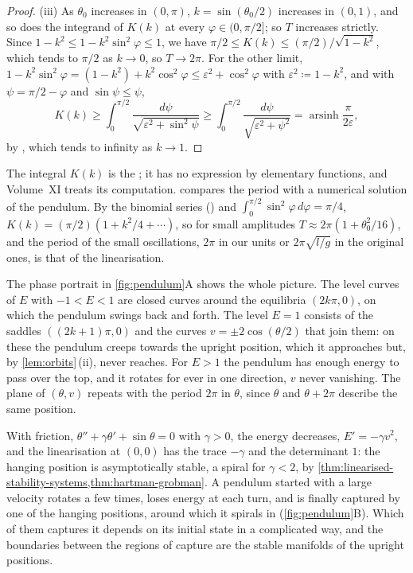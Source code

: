 \begin{proof}
(iii) As $\theta_0$ increases in $(0,\pi)$, $k=\sin(\theta_0/2)$ increases in $(0,1)$, and so does the integrand of $K(k)$ at every $\varphi\in(0,\pi/2]$; so $T$ increases strictly. Since $1-k^2\le1-k^2\sin^2\varphi\le1$, we have $\pi/2\le K(k)\le(\pi/2)/\sqrt{1-k^2}$, which tends to $\pi/2$ as $k\to0$, so $T\to2\pi$. For the other limit, $1-k^2\sin^2\varphi=(1-k^2)+k^2\cos^2\varphi\le\varepsilon^2+\cos^2\varphi$ with $\varepsilon^2\coloneqq1-k^2$, and with $\psi=\pi/2-\varphi$ and $\sin\psi\le\psi$,
\[
K(k)\ge\int_0^{\pi/2}\frac{d\psi}{\sqrt{\varepsilon^2+\sin^2\psi}}\ge\int_0^{\pi/2}\frac{d\psi}{\sqrt{\varepsilon^2+\psi^2}}=\operatorname{arsinh}\frac\pi{2\varepsilon},
\]
by , which tends to infinity as $k\to1$.
\end{proof}

The integral $K(k)$ is the ; it has no expression by elementary functions, and Volume~XI treats its computation.  compares the period with a numerical solution of the pendulum. By the binomial series () and $\int_0^{\pi/2}\sin^2\varphi\,d\varphi=\pi/4$, $K(k)=(\pi/2)(1+k^2/4+\cdots)$, so for small amplitudes $T\approx2\pi(1+\theta_0^2/16)$, and the period of the small oscillations, $2\pi$ in our units or $2\pi\sqrt{l/g}$ in the original ones, is that of the linearisation.

The phase portrait in \cref{fig:pendulum}A shows the whole picture. The level curves of $E$ with $-1<E<1$ are closed curves around the equilibria $(2k\pi,0)$, on which the pendulum swings back and forth. The level $E=1$ consists of the saddles $((2k+1)\pi,0)$ and the curves $v=\pm2\cos(\theta/2)$ that join them: on these  the pendulum creeps towards the upright position, which it approaches but, by \cref{lem:orbits}\,(ii), never reaches. For $E>1$ the pendulum has enough energy to pass over the top, and it rotates for ever in one direction, $v$ never vanishing. The plane of $(\theta,v)$ repeats with the period $2\pi$ in $\theta$, since $\theta$ and $\theta+2\pi$ describe the same position.

With friction, $\theta''+\gamma\theta'+\sin\theta=0$ with $\gamma>0$, the energy decreases, $E'=-\gamma v^2$, and the linearisation at $(0,0)$ has the trace $-\gamma$ and the determinant $1$: the hanging position is asymptotically stable, a spiral for $\gamma<2$, by \cref{thm:linearised-stability-systems,thm:hartman-grobman}. A pendulum started with a large velocity rotates a few times, loses energy at each turn, and is finally captured by one of the hanging positions, around which it spirals in (\cref{fig:pendulum}B). Which of them captures it depends on its initial state in a complicated way, and the boundaries between the regions of capture are the stable manifolds of the upright positions.


